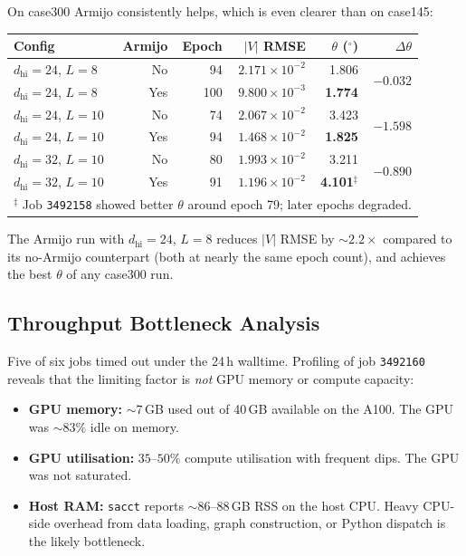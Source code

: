 \documentclass{article}
\begin{document}
On case300 Armijo consistently helps, which is even clearer than on case145:

\begin{center}
\begin{tabular}{lrrrrr}
\toprule
Config & Armijo & Epoch & $|V|$ RMSE & $\theta$ (${}^\circ$) & $\Delta\theta$ \\
\midrule
$d_{\mathrm{hi}}=24$, $L=8$  & No  & 94  & $2.171\times10^{-2}$ & 1.806 & \multirow{2}{*}{$-0.032$} \\
$d_{\mathrm{hi}}=24$, $L=8$  & Yes & 100 & $9.800\times10^{-3}$ & \textbf{1.774} & \\
\midrule
$d_{\mathrm{hi}}=24$, $L=10$ & No  & 74  & $2.067\times10^{-2}$ & 3.423 & \multirow{2}{*}{$-1.598$} \\
$d_{\mathrm{hi}}=24$, $L=10$ & Yes & 94  & $1.468\times10^{-2}$ & \textbf{1.825} & \\
\midrule
$d_{\mathrm{hi}}=32$, $L=10$ & No  & 80  & $1.993\times10^{-2}$ & 3.211 & \multirow{2}{*}{$-0.890$} \\
$d_{\mathrm{hi}}=32$, $L=10$ & Yes & 91  & $1.196\times10^{-2}$ & \textbf{4.101}$^\ddagger$ & \\
\bottomrule
\multicolumn{6}{l}{${}^\ddagger$ Job \texttt{3492158} showed better $\theta$ around epoch 79; later epochs degraded.}
\end{tabular}
\end{center}

The Armijo run with $d_{\mathrm{hi}}=24$, $L=8$ reduces $|V|$ RMSE by
$\sim2.2\times$ compared to its no-Armijo counterpart (both at nearly the
same epoch count), and achieves the best $\theta$ of any case300 run.

\subsection{Throughput Bottleneck Analysis}

Five of six jobs timed out under the 24\,h walltime.  Profiling of job
\texttt{3492160} reveals that the limiting factor is \emph{not} GPU memory or
compute capacity:

\begin{itemize}[noitemsep]
  \item \textbf{GPU memory:} $\sim7$\,GB used out of 40\,GB available on
    the A100.  The GPU was $\sim83\%$ idle on memory.
  \item \textbf{GPU utilisation:} $35$--$50\%$ compute utilisation with
    frequent dips.  The GPU was not saturated.
  \item \textbf{Host RAM:} \texttt{sacct} reports $\sim86$--$88$\,GB RSS
    on the host CPU.  Heavy CPU-side overhead from data loading,
    graph construction, or Python dispatch is the likely bottleneck.
\end{itemize}
\end{document}
